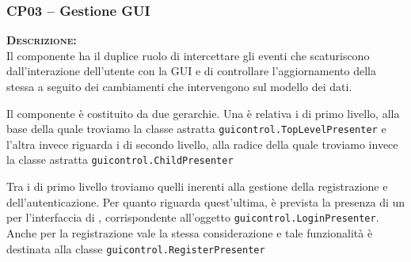 \subsubsection{CP03 -- Gestione GUI}
\begin{description}
	\item{\scshape\bfseries Descrizione:}\\
Il componente ha il duplice ruolo di intercettare gli eventi che scaturiscono dall'interazione dell'utente con la GUI e di controllare l'aggiornamento della stessa a seguito dei cambiamenti che intervengono sul modello dei dati.

Il componente è costituito da due gerarchie. Una è relativa i  di primo livello, alla base della quale troviamo la classe astratta \texttt{guicontrol.TopLevelPresenter} e l'altra invece riguarda i di secondo livello, alla radice della quale troviamo invece la classe astratta \texttt{guicontrol.ChildPresenter}

Tra i  di primo livello troviamo quelli inerenti alla gestione della registrazione e dell'autenticazione.
Per quanto riguarda quest'ultima, è prevista la presenza di un  per l'interfaccia di , corrispondente all'oggetto \texttt{guicontrol.LoginPresenter}. Anche per la registrazione vale la stessa considerazione e tale funzionalità è destinata alla classe \texttt{guicontrol.RegisterPresenter}

%








\end{description}

